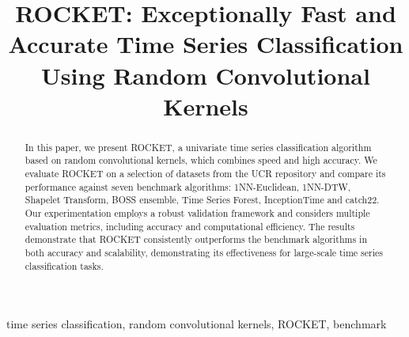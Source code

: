 \documentclass[conference]{IEEEtran}
\begin{document}
\title{ROCKET: Exceptionally Fast and Accurate Time Series Classification Using Random Convolutional Kernels}

\author{
\and
{}
\and
{}
\and
{}
}

\maketitle

\begin{abstract}
In this paper, we present ROCKET, a univariate time series classification algorithm based on random convolutional kernels, which combines speed and high accuracy. We evaluate ROCKET on a selection of datasets from the UCR repository and compare its performance against seven benchmark algorithms: 1NN-Euclidean, 1NN-DTW, Shapelet Transform, BOSS ensemble, Time Series Forest, InceptionTime and catch22. Our experimentation employs a robust validation framework and considers multiple evaluation metrics, including accuracy and computational efficiency. The results demonstrate that ROCKET consistently outperforms the benchmark algorithms in both accuracy and scalability, demonstrating its effectiveness for large-scale time series classification tasks.
\end{abstract}

\begin{IEEEkeywords}
time series classification, random convolutional kernels, ROCKET, benchmark
\end{IEEEkeywords}
\end{document}

